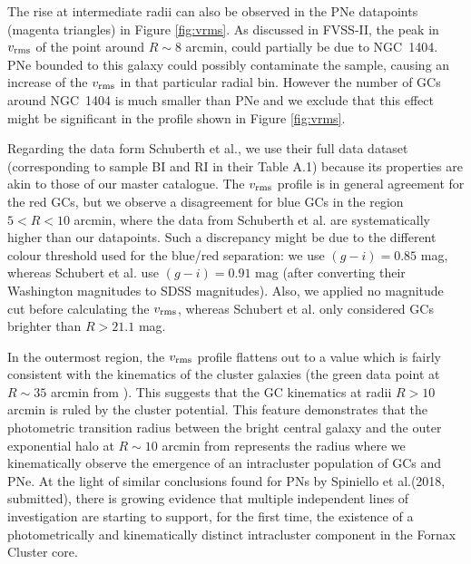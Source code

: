 \documentclass[usenatbib]{mnras}
\begin{document}
The rise at intermediate radii can also be observed in the PNe datapoints
(magenta triangles) in Figure \ref{fig:vrms}. As discussed in FVSS-II, the peak in $v_{\rm rms}$
of the point around $R\sim 8$ arcmin, could partially be due to NGC~1404.
PNe bounded to this galaxy could possibly contaminate the
sample, causing an increase of the $v_{\rm rms}$ in that particular radial bin.
However the number of GCs around NGC~1404 is much smaller than PNe and we exclude
that this effect might be significant in the profile shown in Figure \ref{fig:vrms}.

Regarding the data form Schuberth et al., we use their full data dataset (corresponding to
sample BI and RI in their Table A.1) because its properties are akin to those of our master catalogue.
The $v_{\rm rms}$ profile is in general agreement for the red GCs, but we
observe a disagreement for blue GCs in the region $5<R<10$ arcmin, where the data from
Schuberth et al. are systematically higher than our datapoints. Such a discrepancy
might be due to the different colour threshold used for the blue/red separation: we
use $(g-i) = 0.85$ mag, whereas Schubert et al. use $(g-i) = 0.91$ mag (after converting
their Washington magnitudes to SDSS magnitudes). Also, we applied no magnitude cut before
calculating the $v_{\rm rms}$, whereas Schubert et al. only considered GCs brighter than $R>21.1$ mag.

In the outermost region, the $v_{\rm rms}$ profile flattens out to a value which is
fairly consistent with the kinematics of the cluster galaxies (the green data
point at $R\sim35$ arcmin from \citealt{Drinkwater00}). This suggests that the GC
kinematics at radii $R>10$ arcmin is ruled by the cluster potential.
This feature demonstrates that the photometric transition radius
between the bright central galaxy and the outer exponential halo at $R\sim10$
arcmin from \citet{Iodice16} represents the radius where we kinematically observe the
emergence of an intracluster population of GCs and PNe.
At the light of similar conclusions found for PNs by Spiniello et al.(2018, submitted),
there is  growing evidence that multiple independent lines of investigation
are starting to support, for the first time, the existence of a photometrically
and kinematically distinct intracluster component in the Fornax Cluster core.
\end{document}
